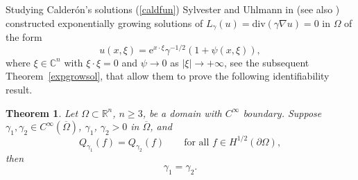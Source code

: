 \documentclass[10pt, a4paper, twoside, openright]{book}
\theoremstyle{definition}
\theoremstyle{plain}
\newtheorem{theorem}[subsection]{Theorem}
\theoremstyle{plain}
\theoremstyle{plain}
\theoremstyle{plain}
\theoremstyle{plain}
\theoremstyle{plain}
\theoremstyle{plain}
\theoremstyle{plain}
\begin{document}
Studying Calder\'on's solutions (\ref{caldfun}) Sylvester and Uhlmann in \cite{Sy-Uh}
(see also \cite{Sy-Uh86})
constructed exponentially growing solutions of $L_{\gamma}(u)=\mathrm{div}(\gamma\nabla u)=0$
in $\Omega$ of the form
$$u(x,\xi)=\mathrm{e}^{x\cdot\xi}\gamma^{-1/2}(1+\psi(x,\xi)),$$
where $\xi\in\mathbb{C}^n$ with $\xi\cdot\xi=0$
and $\psi\to0$ as $|\xi|\to+\infty$, see the subsequent Theorem~\ref{expgrowsol},
that allow them to prove the following identifiability result.

\begin{theorem}
\label{sy-ul-teo}
Let $\Omega\subset\mathbb{R}^n$, $n\geq3$, be a domain with
$C^{\infty}$ boundary. Suppose $\gamma_1, \gamma_2\in C^{\infty}(\overline{\Omega})$,
$\gamma_1$, $\gamma_2>0$ in $\overline{\Omega}$, and
\begin{equation}
\label{1=2}
Q_{\gamma_1}(f)=Q_{\gamma_2}(f)\qquad\textrm{for all }
f\in H^{1/2}(\partial\Omega),
\end{equation}
then
$$\gamma_1=\gamma_2.$$
\end{theorem}
\end{document}
